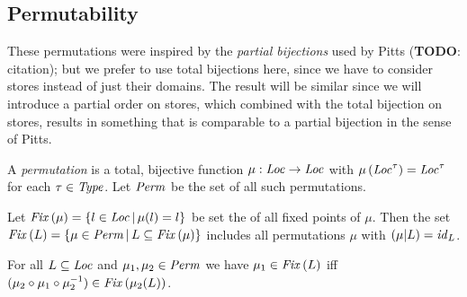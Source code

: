 \documentclass[12pt,a4paper]{report}
\newcommand{\CVal}{\nstyle{CVal}}
\newcommand{\id}{\nstyle{id}}
\newcommand{\Fix}[1]{\nstyle{Fix}\,(#1)}
\begin{document}
%
%


\subsection{Permutability}

These permutations were inspired by the {\em partial bijections} used by Pitts ({\bf TODO}: citation);
but we prefer to use total bijections here, since we have to consider stores instead of just their domains.
The result will be similar since we will introduce a partial order on stores, which combined with the
total bijection on stores, results in something that is comparable to a partial bijection in the sense
of Pitts.

\begin{definition}[Permutation]
  A {\em permutation} is a total, bijective function $\mu:\mathit{Loc}\to\mathit{Loc}$ with
  $\mu\,(\mathit{Loc}^\tau)=\mathit{Loc}^\tau$ for each $\tau\in\mathit{Type}$. Let $\mathit{Perm}$ be the
  set of all such permutations.
\end{definition}

Let $\Fix{\mu} = \{l\in\Loc\,|\,\mu(l)=l\}$ be set the of all fixed points of $\mu$. Then
the set $\Fix{L} = \{\mu\in\Perm\,|\,L \subseteq \Fix{\mu}\}$ includes all
permutations $\mu$ with $(\mu|L) = \id_L$.

\begin{lemma}
  For all $L \subseteq \mathit{Loc}$ and $\mu_1,\mu_2\in\mathit{Perm}$ we have
  $\mu_1\in\Fix{L}$ iff $(\mu_2 \circ \mu_1 \circ \mu_2^{-1})\in\Fix{{\mu_2(L)}}$.
\end{lemma}
\end{document}
